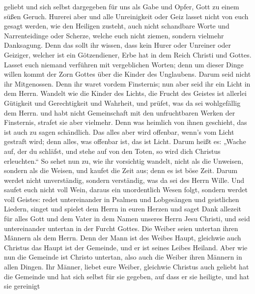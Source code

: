 geliebt und sich selbst dargegeben für uns als Gabe und Opfer, Gott zu
einem süßen Geruch.  Hurerei aber und alle Unreinigkeit oder
Geiz lasset nicht von euch gesagt werden, wie den Heiligen zusteht,
 auch nicht schandbare Worte und Narrenteidinge oder
Scherze, welche euch nicht ziemen, sondern vielmehr Danksagung.
 Denn das sollt ihr wissen, dass kein Hurer oder Unreiner
oder Geiziger, welcher ist ein Götzendiener, Erbe hat in dem Reich
Christi und Gottes.  Lasset euch niemand verführen mit
vergeblichen Worten; denn um dieser Dinge willen kommt der Zorn Gottes
über die Kinder des Unglaubens.  Darum seid nicht ihr
Mitgenossen.  Denn ihr waret vordem Finsternis; nun aber
seid ihr ein Licht in dem Herrn.  Wandelt wie die Kinder des
Lichts, die Frucht des Geistes ist allerlei Gütigkeit und Gerechtigkeit
und Wahrheit,  und prüfet, was da sei wohlgefällig dem
Herrn.  und habt nicht Gemeinschaft mit den unfruchtbaren
Werken der Finsternis, strafet sie aber vielmehr.  Denn was
heimlich von ihnen geschieht, das ist auch zu sagen schändlich.
 Das alles aber wird offenbar, wenn's vom Licht gestraft
wird; denn alles, was offenbar ist, das ist Licht.  Darum
heißt es: „Wache auf, der du schläfst, und stehe auf von den Toten, so
wird dich Christus erleuchten.``  So sehet nun zu, wie ihr
vorsichtig wandelt, nicht als die Unweisen, sondern als die Weisen,
 und kaufet die Zeit aus; denn es ist böse Zeit.
 Darum werdet nicht unverständig, sondern verständig, was
da sei des Herrn Wille.  Und saufet euch nicht voll Wein,
daraus ein unordentlich Wesen folgt, sondern werdet voll Geistes:
 redet untereinander in Psalmen und Lobgesängen und
geistlichen Liedern, singet und spielet dem Herrn in euren Herzen
 und saget Dank allezeit für alles Gott und dem Vater in
dem Namen unseres Herrn Jesu Christi,  und seid
untereinander untertan in der Furcht Gottes.  Die Weiber
seien untertan ihren Männern als dem Herrn.  Denn der Mann
ist des Weibes Haupt, gleichwie auch Christus das Haupt ist der
Gemeinde, und er ist seines Leibes Heiland.  Aber wie nun
die Gemeinde ist Christo untertan, also auch die Weiber ihren Männern in
allen Dingen.  Ihr Männer, liebet eure Weiber, gleichwie
Christus auch geliebt hat die Gemeinde und hat sich selbst für sie
gegeben,  auf dass er sie heiligte, und hat sie gereinigt
